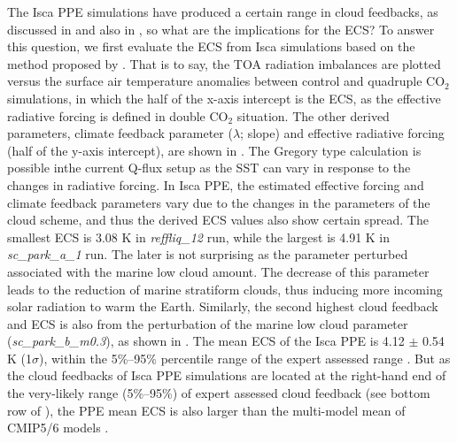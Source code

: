 The Isca PPE simulations have produced a certain range in cloud feedbacks, as discussed in  and also in , so what are the implications for the ECS? To answer this question, we first evaluate the ECS from Isca simulations based on the method proposed by \cite{Gregory2004}. That is to say, the TOA radiation imbalances are plotted versus the surface air temperature anomalies between control and quadruple CO$_2$ simulations, in which the half of the x-axis intercept is the ECS, as the effective radiative forcing is defined in double CO$_2$ situation. The other derived parameters, climate feedback parameter ($\lambda$; slope) and effective radiative forcing (half of the y-axis intercept), are shown in . The Gregory type calculation is possible inthe current Q-flux setup as the SST can vary in response to the changes in radiative forcing. In Isca PPE, the estimated effective forcing and climate feedback parameters vary due to the changes in the parameters of the cloud scheme, and thus the derived ECS values also show certain spread. The smallest ECS is 3.08 K in \textit{reffliq\_12} run, while the largest is 4.91 K in \textit{sc\_park\_a\_1} run. The later is not surprising as the parameter perturbed associated with the marine low cloud amount. The decrease of this parameter leads to the reduction of marine stratiform clouds, thus inducing more incoming solar radiation to warm the Earth. Similarly, the second highest cloud feedback and ECS is also from the perturbation of the marine low cloud parameter (\textit{sc\_park\_b\_m0.3}), as shown in . The mean ECS of the Isca PPE is 4.12 $\pm$ 0.54 K (1$\sigma$), within the 5\%--95\% percentile range of the expert assessed range \citep{Sherwood2020}. But as the cloud feedbacks of Isca PPE simulations are located at the right-hand end of the very-likely range (5\%--95\%) of expert assessed cloud feedback (see bottom row of ), the PPE mean ECS is also larger than the multi-model mean of CMIP5/6 models \citep[see Fig. 1 of ][]{Zelinka2020causes}.

